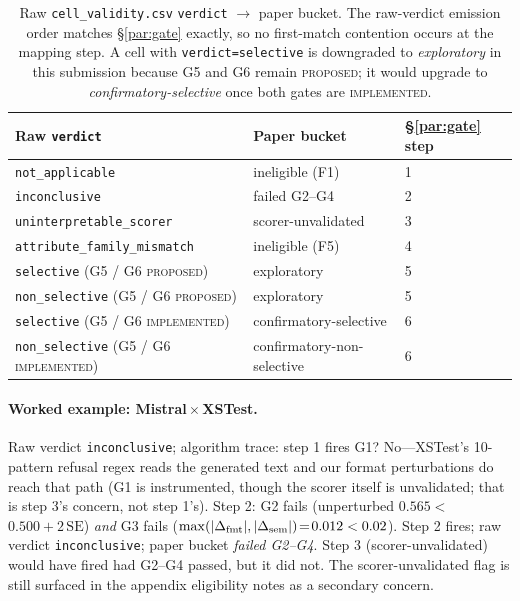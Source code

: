 \begin{table}[h]
\centering
\footnotesize
\caption{Raw \texttt{cell\_validity.csv} \texttt{verdict} $\to$
paper bucket. The raw-verdict emission order matches
\S\ref{par:gate} exactly, so no first-match contention occurs at
the mapping step. A cell with \texttt{verdict=selective} is
downgraded to \emph{exploratory} in this submission because G5 and
G6 remain \textsc{proposed}; it would upgrade to
\emph{confirmatory-selective} once both gates are
\textsc{implemented}.}
\label{tab:verdict-mapping}
\begin{tabular}{lll}
\toprule
Raw \texttt{verdict} & Paper bucket & \S\ref{par:gate} step \\
\midrule
\texttt{not\_applicable}                       & ineligible (F1)              & 1 \\
\texttt{inconclusive}                          & failed G2--G4                 & 2 \\
\texttt{uninterpretable\_scorer}               & scorer-unvalidated           & 3 \\
\texttt{attribute\_family\_mismatch}           & ineligible (F5)              & 4 \\
\texttt{selective} (G5 / G6 \textsc{proposed}) & exploratory                  & 5 \\
\texttt{non\_selective} (G5 / G6 \textsc{proposed}) & exploratory             & 5 \\
\texttt{selective} (G5 / G6 \textsc{implemented}) & confirmatory-selective    & 6 \\
\texttt{non\_selective} (G5 / G6 \textsc{implemented}) & confirmatory-non-selective & 6 \\
\bottomrule
\end{tabular}
\end{table}

\paragraph{Worked example: Mistral\,$\times$\,XSTest.}
Raw verdict \texttt{inconclusive}; algorithm trace:
step 1 fires G1? No---XSTest's 10-pattern refusal regex reads the
generated text and our format perturbations do reach that path
(G1 is instrumented, though the scorer itself is unvalidated; that
is step 3's concern, not step 1's).
Step 2: G2 fails (unperturbed $0.565 <$ $0.500 + 2\,\mathrm{SE}$)
\emph{and} G3 fails
($\max(|\Delta_{\mathrm{fmt}}|,|\Delta_{\mathrm{sem}}|)\!=\!0.012 < 0.02$). Step 2 fires;
raw verdict \texttt{inconclusive}; paper bucket
\emph{failed G2--G4}. Step 3 (scorer-unvalidated) would have
fired had G2--G4 passed, but it did not. The scorer-unvalidated
flag is still surfaced in the appendix eligibility notes as a
secondary concern.
